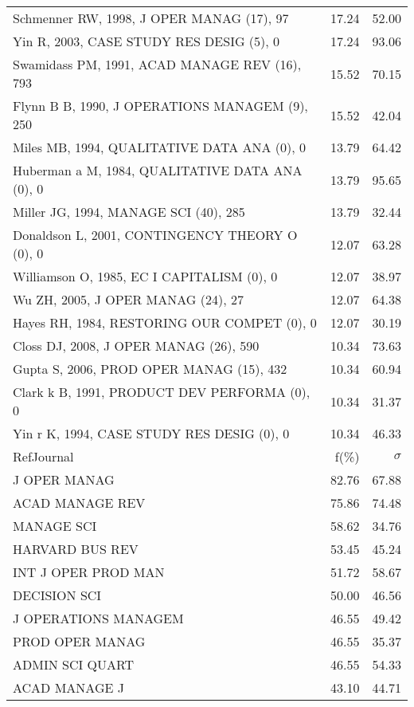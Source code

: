 \documentclass[a4paper,11pt]{report}
\begin{document}
\begin{landscape}
\begin{table}[!ht]
{\begin{tabular}{|l r r|}
Schmenner RW, 1998, J OPER MANAG (17), 97 & 17.24 & 52.00\\
Yin R, 2003, CASE STUDY RES DESIG (5), 0 & 17.24 & 93.06\\
Swamidass PM, 1991, ACAD MANAGE REV (16), 793 & 15.52 & 70.15\\
Flynn B B, 1990, J OPERATIONS MANAGEM (9), 250 & 15.52 & 42.04\\
Miles MB, 1994, QUALITATIVE DATA ANA (0), 0 & 13.79 & 64.42\\
Huberman a M, 1984, QUALITATIVE DATA ANA (0), 0 & 13.79 & 95.65\\
Miller JG, 1994, MANAGE SCI (40), 285 & 13.79 & 32.44\\
Donaldson L, 2001, CONTINGENCY THEORY O (0), 0 & 12.07 & 63.28\\
Williamson O, 1985, EC I CAPITALISM (0), 0 & 12.07 & 38.97\\
Wu ZH, 2005, J OPER MANAG (24), 27 & 12.07 & 64.38\\
Hayes RH, 1984, RESTORING OUR COMPET (0), 0 & 12.07 & 30.19\\
Closs DJ, 2008, J OPER MANAG (26), 590 & 10.34 & 73.63\\
Gupta S, 2006, PROD OPER MANAG (15), 432 & 10.34 & 60.94\\
Clark k B, 1991, PRODUCT DEV PERFORMA (0), 0 & 10.34 & 31.37\\
Yin r K, 1994, CASE STUDY RES DESIG (0), 0 & 10.34 & 46.33\\
\hline
\hline
RefJournal & f(\%) & $\sigma$\\
\hline
J OPER MANAG & 82.76 & 67.88\\
ACAD MANAGE REV & 75.86 & 74.48\\
MANAGE SCI & 58.62 & 34.76\\
HARVARD BUS REV & 53.45 & 45.24\\
INT J OPER PROD MAN & 51.72 & 58.67\\
DECISION SCI & 50.00 & 46.56\\
J OPERATIONS MANAGEM & 46.55 & 49.42\\
PROD OPER MANAG & 46.55 & 35.37\\
ADMIN SCI QUART & 46.55 & 54.33\\
ACAD MANAGE J & 43.10 & 44.71\\
\hline
\end{tabular}
}
\end{table}

\clearpage


\end{landscape}
\end{document}
